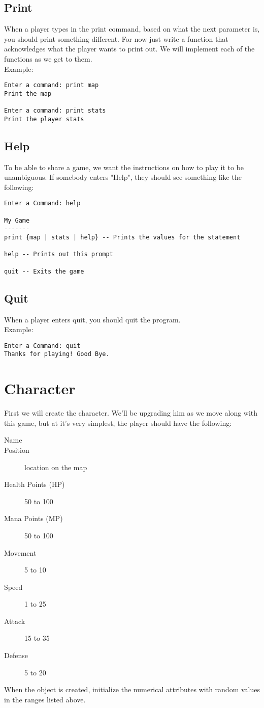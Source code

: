\documentclass{article}
\begin{document}
\subsection{Print}
When a player types in the print command, based on what the next parameter is, you should print something different. For now just write a function that acknowledges what the player wants to print out. We will implement each of the functions as we get to them.\\
Example:
\begin{lstlisting}
Enter a command: print map
Print the map

Enter a command: print stats
Print the player stats
\end{lstlisting}

\subsection{Help}
To be able to share a game, we want the instructions on how to play it to be unambiguous. If somebody enters "Help", they should see something like the following:

\begin{lstlisting}
Enter a Command: help

My Game
-------
print {map | stats | help} -- Prints the values for the statement

help -- Prints out this prompt

quit -- Exits the game
\end{lstlisting}

\subsection{Quit}
When a player enters quit, you should quit the program.\\
Example: 
\begin{lstlisting}
Enter a Command: quit
Thanks for playing! Good Bye.
\end{lstlisting}

\section{Character}
First we will create the character. We'll be upgrading him as we move along with this game, but at it's very simplest, the player should have the following:
\begin{description}
\item[Name]
\item[Position] location on the map
\item[Health Points (HP)] 50 to 100
\item[Mana Points (MP)] 50 to 100
\item[Movement] 5 to 10
\item[Speed] 1 to 25
\item[Attack] 15 to 35
\item[Defense] 5 to 20
\end{description}
When the object is created, initialize the numerical attributes with random values in the ranges listed above. 
\end{document}
